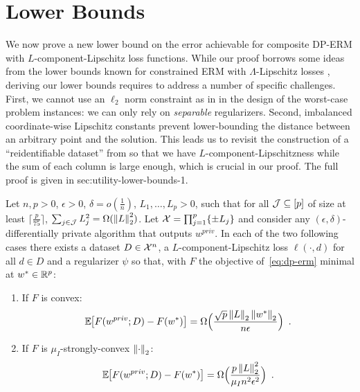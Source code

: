 
\section{Lower Bounds}
\label{sec:utility-lower-bounds}

We now prove a new lower bound on the error achievable for composite DP-ERM
with $L$-component-Lipschitz loss
functions. While our proof borrows some ideas from the lower bounds known for
constrained ERM with $\Lambda$-Lipschitz losses \citep{bassily2014Private},
deriving our lower
bounds requires to address a number of specific challenges.
First, we cannot use an $\ell_2$ norm constraint as in
\citet{bassily2014Private} in the design of the worst-case problem instances:
we can only
rely on \emph{separable} regularizers. Second, imbalanced coordinate-wise
Lipschitz constants prevent lower-bounding the distance between an arbitrary
point and the solution. This leads us to revisit
the construction of a ``reidentifiable dataset'' from
\citet{bun2014Fingerprinting} so that we
have $L$-component-Lipschitzness while the sum of each
column is large enough, which is crucial in our proof. The full proof is given
in \Cref
{sec:utility-lower-bounds-1}.
\begin{theorem}
  \label{thm:utility-lower-bounds}
  Let $n, p > 0$, $\epsilon > 0$, $\delta = o(\frac{1}{n})$,
  $L_1, \dots, L_p > 0$, such that for all $\mathcal J \subseteq [p]$ of size at least
  $\lceil \frac{p}{75} \rceil$, $\sum_{j\in\mathcal J} L_j^2 = \Omega(\left \lVert L \right \rVert_2^2)$.
  Let $\mathcal X = \prod_{j=1}^p \{\pm L_j\}$ and consider any
  $(\epsilon, \delta)$-differentially private algorithm that outputs $w^{priv}$.
  In each of the two following cases there exists a dataset $D \in \mathcal X^n$,
  a $L$-component-Lipschitz loss $\ell(\cdot, d)$ for all $d \in D$ and a
  regularizer $\psi$ so that, with $F$ the objective of~\eqref{eq:dp-erm}
  minimal at $w^* \in \mathbb R^p$:
  \begin{enumerate}
    \item If $F$ is convex:
          \begin{align*}
            \mathbb E_{} \hspace{-0.29em} \left[ F(w^{priv};D) - F(w^*) \right] = \Omega\Big( \frac{\sqrt{p} \left \lVert L \right \rVert_2
              \left \lVert w^* \right \rVert_2}{n\epsilon} \Big)\enspace.
          \end{align*}
    \item If $F$ is $\mu_I$-strongly-convex \wrt $\left \lVert \cdot \right \rVert_2$:
          \begin{align*}
            \mathbb E_{} \hspace{-0.29em} \left[ F(w^{priv};D) - F(w^*) \right] = \Omega\Big( \frac{p \left \lVert L \right \rVert_2^2}{\mu_I
              n^2\epsilon^2} \Big)\enspace.
          \end{align*}
  \end{enumerate}
\end{theorem}
